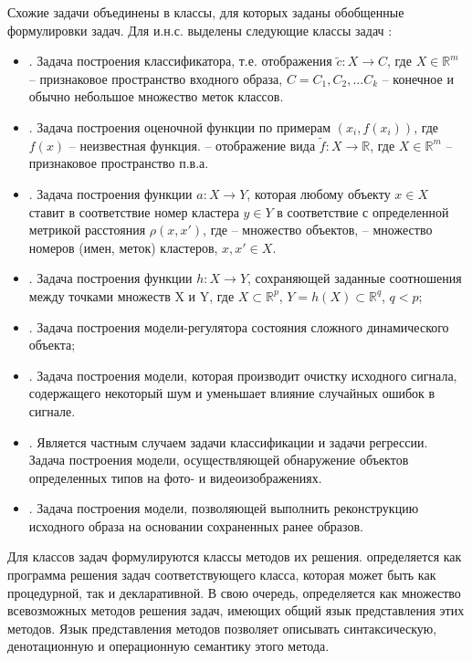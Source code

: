 Схожие задачи объединены в классы, для которых заданы обобщенные формулировки задач. Для и.н.с. выделены следующие классы задач :
\begin{itemize}
	\item {}. Задача построения классификатора, т.е. отображения $\tilde c: X \rightarrow C$, где $ X \in \mathbb{R}^m$ -- признаковое пространство входного образа, $C = {C_1, C_2, ...C_k }$ -- конечное и обычно небольшое множество меток классов.
	\item {}. Задача построения оценочной функции по примерам $(x_i, f(x_i))$, где $f(x)$ -- неизвестная функция.  -- отображение вида $\tilde{f}: X \rightarrow \mathbb{R}$, где $X \in \mathbb{R}^m$ -- признаковое пространство п.в.а.
	\item {}. Задача построения функции $a: X \rightarrow Y$, которая любому объекту $x \in X$ ставит в соответствие номер кластера $y \in Y$ в соответствие с определенной метрикой расстояния $\rho(x, x')$, где  -- множество объектов,  -- множество номеров (имен, меток) кластеров, $x, x' \in X$.
	\item {}. Задача построения функции $h: X \rightarrow Y$, сохраняющей заданные соотношения между точками множеств X и Y, где $X \subset \mathbb{R}^p$, $Y=h(X) \subset \mathbb{R}^q$, $q < p$;
	\item {}. Задача построения модели-регулятора состояния сложного динамического объекта;
	\item {}. Задача построения модели, которая производит очистку исходного сигнала, содержащего некоторый шум и уменьшает влияние случайных ошибок в сигнале.
	\item {}. Является частным случаем задачи классификации и задачи регрессии. Задача построения модели, осуществляющей обнаружение объектов определенных типов на фото- и видеоизображениях.
	\item {}. Задача построения модели, позволяющей выполнить реконструкцию исходного образа на основании сохраненных ранее образов.
\end{itemize}

Для классов задач формулируются классы методов их решения.  определяется как программа решения задач соответствующего класса, которая может быть как процедурной, так и декларативной. В свою очередь,  определяется как множество всевозможных методов решения задач, имеющих общий язык представления этих методов. Язык представления методов позволяет описывать синтаксическую, денотационную и операционную семантику этого метода.

